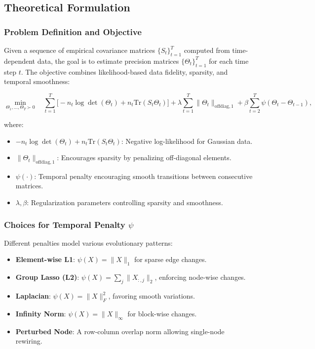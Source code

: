 \documentclass{article}
\begin{document}
\subsection{Theoretical Formulation}
\label{subsec:theory}

\subsubsection{Problem Definition and Objective}
Given a sequence of empirical covariance matrices $\{S_t\}_{t=1}^T$ computed from time-dependent data, the goal is to estimate precision matrices $\{\Theta_t\}_{t=1}^T$ for each time step $t$. The objective combines likelihood-based data fidelity, sparsity, and temporal smoothness:

\begin{equation}
\min_{\Theta_1, \ldots, \Theta_T \succ 0} \quad \sum_{t=1}^T \Big[-n_t \log \det(\Theta_t) + n_t \mathrm{Tr}(S_t \Theta_t) \Big] + \lambda \sum_{t=1}^T \|\Theta_t\|_{\text{offdiag},1} + \beta \sum_{t=2}^T \psi(\Theta_t - \Theta_{t-1}),
\end{equation}

where:
\begin{itemize}
    \item $-n_t \log \det(\Theta_t) + n_t \mathrm{Tr}(S_t \Theta_t)$: Negative log-likelihood for Gaussian data.
    \item $\|\Theta_t\|_{\text{offdiag},1}$: Encourages sparsity by penalizing off-diagonal elements.
    \item $\psi(\cdot)$: Temporal penalty encouraging smooth transitions between consecutive matrices.
    \item $\lambda, \beta$: Regularization parameters controlling sparsity and smoothness.
\end{itemize}

\subsubsection{Choices for Temporal Penalty $\psi$}
Different penalties model various evolutionary patterns:
\begin{itemize}
    \item \textbf{Element-wise L1}: $\psi(X) = \|X\|_1$ for sparse edge changes.
    \item \textbf{Group Lasso (L2)}: $\psi(X) = \sum_j \|X_{:,j}\|_2$, enforcing node-wise changes.
    \item \textbf{Laplacian}: $\psi(X) = \|X\|_F^2$, favoring smooth variations.
    \item \textbf{Infinity Norm}: $\psi(X) = \|X\|_{\infty}$ for block-wise changes.
    \item \textbf{Perturbed Node}: A row-column overlap norm allowing single-node rewiring.
\end{itemize}
\end{document}
